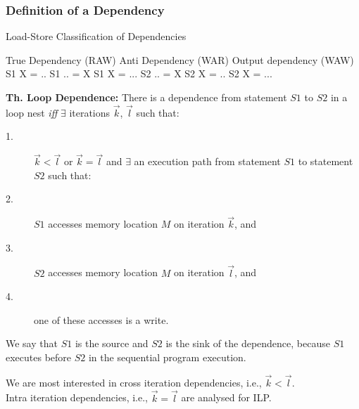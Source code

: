 \documentclass{beamer}
\newcommand{\emp}[1]{\textcolor{DikuRed}{ #1}}
\begin{document}
\begin{frame}[fragile,t]
  \frametitle{Definition of a Dependency} %

\begin{block}{Load-Store Classification of Dependencies}
\begin{colorcode}
True Dependency (RAW)    Anti Dependency (WAR)    Output dependency (WAW)
S1    X  = ..            S1    .. = X             S1    X = ...            
S2    .. = X             S2    X  = ..            S2    X = ...
\end{colorcode}
\end{block} 

\smallskip

{\bf Th. Loop Dependence:} There is a dependence from statement $S1$ to $S2$
in a loop nest {\em iff} $\exists$ iterations $\vec{k}$, $\vec{l}$ such that:
\begin{description}
    \item[1.] $\vec{k} < \vec{l}$ or $\vec{k} = \vec{l}$ and $\exists$ 
                an execution path from statement $S1$ to statement $S2$ \emp{such that:}
    \item[2.] $S1$ accesses memory location $M$ on iteration $\vec{k}$, and
    \item[3.] $S2$ accesses memory location $M$ on iteration $\vec{l}$, and
    \item[4.] one of these accesses is a write.
\end{description}
\medskip

\emp{We say that $S1$ is the source and $S2$ is the sink of the dependence}, 
because $S1$ executes before $S2$ in the sequential program execution.

\medskip
We are most interested in cross iteration dependencies, i.e., $\vec{k} < \vec{l}$.\\\smallskip
Intra iteration dependencies, i.e., $\vec{k} = \vec{l}$ are analysed for ILP. 

\end{frame}
\end{document}
